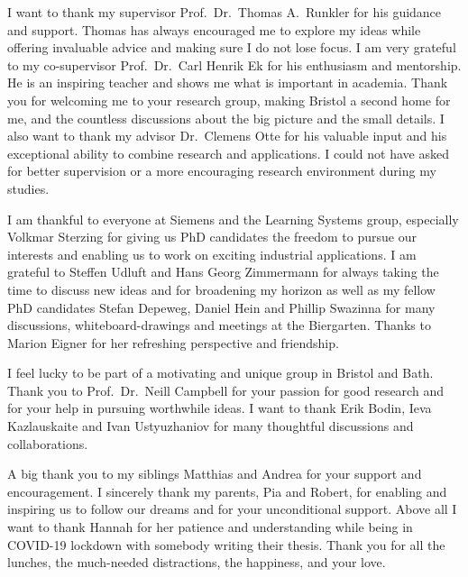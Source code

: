 \begin{Acknowledgements}
    I want to thank my supervisor Prof.~Dr.~Thomas A.~Runkler for his guidance and support.
    Thomas has always encouraged me to explore my ideas while offering invaluable advice and making sure I do not lose focus.
    I am very grateful to my co-supervisor Prof.~Dr.~Carl Henrik Ek for his enthusiasm and mentorship.
    He is an inspiring teacher and shows me what is important in academia.
    Thank you for welcoming me to your research group, making Bristol a second home for me, and the countless discussions about the big picture and the small details.
    I also want to thank my advisor Dr.~Clemens Otte for his valuable input and his exceptional ability to combine research and applications.
    I could not have asked for better supervision or a more encouraging research environment during my studies.

    I am thankful to everyone at Siemens and the Learning Systems group, especially Volkmar Sterzing for giving us PhD candidates the freedom to pursue our interests and enabling us to work on exciting industrial applications.
    I am grateful to Steffen Udluft and Hans Georg Zimmermann for always taking the time to discuss new ideas and for broadening my horizon as well as my fellow PhD candidates Stefan Depeweg, Daniel Hein and Phillip Swazinna for many discussions, whiteboard-drawings and meetings at the Biergarten.
    Thanks to Marion Eigner for her refreshing perspective and friendship.

    I feel lucky to be part of a motivating and unique group in Bristol and Bath.
    Thank you to Prof.~Dr.~Neill Campbell for your passion for good research and for your help in pursuing worthwhile ideas.
    I want to thank Erik Bodin, Ieva Kazlauskaite and Ivan Ustyuzhaniov for many thoughtful discussions and collaborations.

    A big thank you to my siblings Matthias and Andrea for your support and encouragement.
    I sincerely thank my parents, Pia and Robert, for enabling and inspiring us to follow our dreams and for your unconditional support.
    Above all I want to thank Hannah for her patience and understanding while being in COVID-19 lockdown with somebody writing their thesis.
    Thank you for all the lunches, the much-needed distractions, the happiness, and your love.
\end{Acknowledgements}

\tableofcontents
